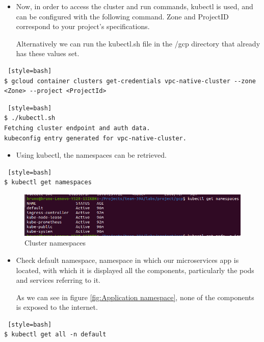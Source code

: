 \documentclass[12pt,a4paper,oneside]{report}
\begin{document}
\begin{itemize}
    \item Now, in order to access the cluster and run commands, kubectl is used, and can be configured with the following command. Zone and ProjectID correspond to your project's specifications.
    
    Alternatively we can run the kubectl.sh file in the /gcp directory that already has these values set. 
    
\end{itemize}
\begin{lstlisting} [style=bash]
$ gcloud container clusters get-credentials vpc-native-cluster --zone <Zone> --project <ProjectId>
\end{lstlisting}

\begin{lstlisting} [style=bash]
$ ./kubectl.sh
Fetching cluster endpoint and auth data.
kubeconfig entry generated for vpc-native-cluster.
\end{lstlisting}

\begin{itemize}
    \item Using kubectl, the namespaces can be retrieved.
\end{itemize}

\begin{lstlisting} [style=bash]
$ kubectl get namespaces
\end{lstlisting}

\begin{figure}[H]
\centering
\includegraphics[width=1.0\textwidth]{./pictures/namespaces.png}
\caption{Cluster namespaces}
\label{fig:Cluster namespaces}
\end{figure}


\begin{itemize}
    \item Check default namespace, namespace in which our microservices app is located, with which it is displayed all the components, particularly the pods and services referring to it.
    
    As we can see in figure \ref{fig:Application  namespace}, none of the components is exposed to the internet.
\end{itemize}
\begin{lstlisting} [style=bash]
$ kubectl get all -n default
\end{lstlisting}
\end{document}

